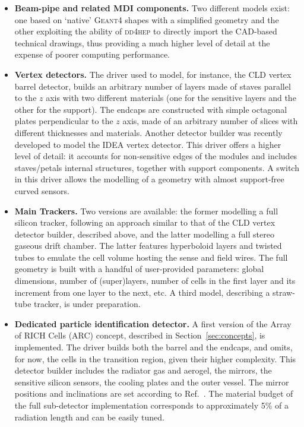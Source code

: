 \begin{itemize}

\item \textbf{Beam-pipe and related MDI components.} 
Two different models exist: one based on `native' \textsc{Geant4} shapes with a simplified geometry 
and the other exploiting the ability of \textsc{dd4hep} to directly import the CAD-based technical drawings, 
thus providing a much higher level of detail at the expense of poorer computing performance.

\item \textbf{Vertex detectors.} 
The driver used to model, for instance, the CLD vertex barrel detector, 
builds an arbitrary number of layers made of staves parallel to the $z$ axis with two different materials 
(one for the sensitive layers and the other for the support). 
The endcaps are constructed with simple octagonal plates perpendicular to the $z$ axis, 
made of an arbitrary number of slices with different thicknesses and materials. 
Another detector builder was recently developed to model the IDEA vertex detector. 
This driver offers a higher level of detail: 
it accounts for non-sensitive edges of the modules and includes staves/petals internal structures, together with support components. 
A switch in this driver allows the modelling of a geometry with almost support-free curved sensors.

\item \textbf{Main Trackers.}
Two versions are available: 
the former modelling a full silicon tracker, following an approach similar to that of the CLD vertex detector builder, described above, and the latter modelling a full stereo gaseous drift chamber. 
The latter features hyperboloid layers and twisted tubes to emulate the cell volume hosting the sense and field wires. 
The full geometry is built with a handful of user-provided parameters:
global dimensions, number of (super)layers, number of cells in the first layer and its increment from one layer to the next, etc. 
A third model, describing a straw-tube tracker, is under preparation.
    
\item \textbf{Dedicated particle identification detector.} 
A first version of the Array of RICH Cells (ARC) concept, described in Section~\ref{sec:concepts}, is implemented. 
The driver builds both the barrel and the endcaps, and omits, for now, the cells in the transition region, given their higher complexity. 
This detector builder includes the radiator gas and aerogel, the mirrors, the sensitive silicon sensors, 
the cooling plates and the outer vessel. 
The mirror positions and inclinations are set according to Ref.~\cite{Tat_ARC}. 
The material budget of the full sub-detector implementation corresponds to approximately 5\% of a radiation length and can be easily tuned.
    

\end{itemize}
